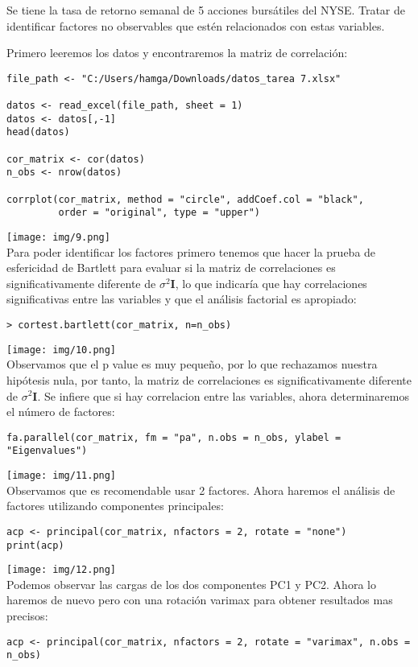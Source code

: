 \begin{problem}{2}
Se tiene la tasa de retorno semanal de 5 acciones bursátiles del NYSE. Tratar de identificar factores no observables que estén relacionados con estas variables.
\end{problem}
\begin{sol}
Primero leeremos los datos y encontraremos la matriz de correlación:
\begin{verbatim}
file_path <- "C:/Users/hamga/Downloads/datos_tarea 7.xlsx"

datos <- read_excel(file_path, sheet = 1)
datos <- datos[,-1]
head(datos)

cor_matrix <- cor(datos)
n_obs <- nrow(datos)

corrplot(cor_matrix, method = "circle", addCoef.col = "black",
         order = "original", type = "upper")
\end{verbatim}
\texttt{[image: img/9.png]}\\
Para poder identificar los factores primero tenemos que hacer la prueba de esfericidad de Bartlett para evaluar si la matriz de correlaciones es significativamente diferente de $\sigma^2 \bm{I}$, lo que indicaría que hay correlaciones significativas entre las variables y que el análisis factorial es apropiado:
\begin{verbatim}
> cortest.bartlett(cor_matrix, n=n_obs)
\end{verbatim}
\texttt{[image: img/10.png]}\\
Observamos que el p value es muy pequeño, por lo que rechazamos nuestra hipótesis nula, por tanto, la matriz de correlaciones es significativamente diferente de $\sigma^2 \bm{I}$. Se infiere que si hay correlacion entre las variables, ahora determinaremos el número de factores:
\begin{verbatim}
fa.parallel(cor_matrix, fm = "pa", n.obs = n_obs, ylabel = "Eigenvalues")
\end{verbatim}
\texttt{[image: img/11.png]}\\
Observamos que es recomendable usar 2 factores. Ahora haremos el análisis de factores utilizando componentes principales:
\begin{verbatim}
acp <- principal(cor_matrix, nfactors = 2, rotate = "none")
print(acp)
\end{verbatim}
\texttt{[image: img/12.png]}\\
Podemos observar las cargas de los dos componentes PC1 y PC2. Ahora lo haremos de nuevo pero con una rotación varimax para obtener resultados mas precisos:
\begin{verbatim}
acp <- principal(cor_matrix, nfactors = 2, rotate = "varimax", n.obs = n_obs)


\end{verbatim}
\end{sol}
